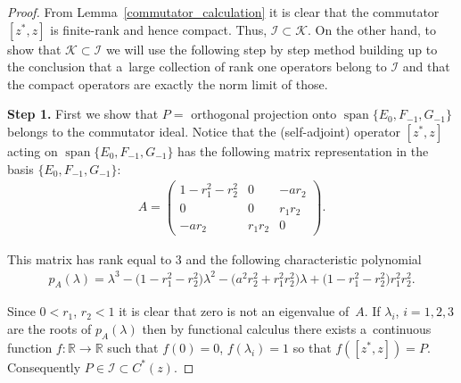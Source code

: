 \documentclass[11pt]{article}
\numberwithin{equation}{section}
\begin{document}
\begin{proof}
From Lemma~\ref{commutator_calculation} it is clear that the commutator $[z^*, z]$ is f\/inite-rank and hence compact.
Thus, $\mathcal I \subset \mathcal K$.
On the other hand, to show that $\mathcal K \subset \mathcal I$ we will use the following step by step method building
up to the conclusion that a~large collection of rank one operators belong to $\mathcal I$ and that the compact operators
are exactly the norm limit of those.

{\bf Step 1.} First we show that $P=$ orthogonal projection onto $\operatorname{span}\{E_0, F_{-1}, G_{-1}\}$ belongs to the commutator
ideal.
Notice that the (self-adjoint) operator $[z^*{,} z]$ acting on $\operatorname{span}\{E_0, F_{{-}1}, G_{{-}1}\}$ has the following matrix
representation in the basis $\{E_0, F_{-1}, G_{-1}\}$:
\begin{gather*}
A= \left(
\begin{matrix}
1-r_1^2-r_2^2 & 0 & -ar_2
\\
0 & 0 & r_1r_2
\\
-ar_2 & r_1r_2 & 0
\end{matrix}
\right).
\end{gather*}

This matrix has rank equal to $3$ and the following characteristic polynomial
\begin{gather*}
p_A(\lambda)=\lambda^3-\big(1-r_1^2-r_2^2\big)\lambda^2-\big(a^2r_2^2+r_1^2r_2^2\big)\lambda+\big(1-r_1^2-r_2^2\big)r_1^2r_2^2.
\end{gather*}

Since $0 < r_1$, $r_2 < 1$ it is clear that zero is not an eigenvalue of~$A$.
If $\lambda_i$, $i=1,2,3$ are the roots of $p_A(\lambda)$ then by functional calculus there exists a~continuous function
$f: \mathbb R \to \mathbb R$ such that $f(0)=0$, $f(\lambda_i)=1$ so that $f([z^*,z])=P$.
Consequently $P \in \mathcal I \subset C^*(z)$.


\end{proof}
\end{document}
